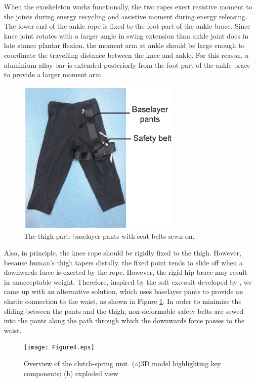 \documentclass[twocolumn,cleanfoot,10pt]{asme2ej}
\begin{document}
When the exoskeleton works functionally, the two ropes exert resistive moment to the joints during energy recycling and assistive moment during energy releasing.
The lower end of the ankle rope is fixed to the foot part of the ankle brace.
Since knee joint rotates with a larger angle in swing extension than ankle joint does in late stance plantar flexion, the moment arm at ankle should be large enough to coordinate the travelling distance between the knee and ankle.
For this reason, a aluminium alloy bar is extended posteriorly from the foot part of the ankle brace to provide a larger moment arm. 

\begin{figure}[b]
	\centering
	\includegraphics[width=8cm]{Figure3.eps}
	\caption{The thigh part: baselayer pants with seat belts sewn on.}
	\label{fig:pants}   
\end{figure}

Also, in principle, the knee rope should be rigidly fixed to the thigh.
However, because human’s thigh tapers distally, the fixed point tends to slide off when a downwards force is exerted by the rope.
However, the rigid hip brace may result in unacceptable weight.
Therefore, inspired by the soft exo-suit developed by \cite{RN20}, we came up with an alternative solution, which uses baselayer pants to provide an elastic connection to the waist, as shown in Figure \ref{fig:pants}.
In order to minimize the sliding between the pants and the thigh, non-deformable safety belts are sewed into the pants along the path through which the downwards force passes to the waist.

\begin{figure}[t]
	\centering
	\texttt{[image: Figure4.eps]}
	\caption{Overview of the clutch-spring unit. (a)3D model highlighting key components; (b) exploded view}
	\label{fig:clutch}   
\end{figure}
\end{document}
